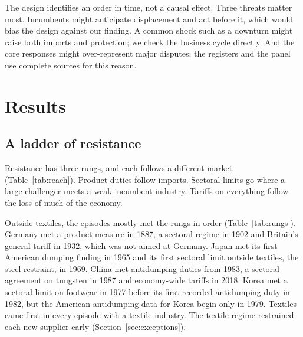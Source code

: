 \documentclass[review,authoryear,12pt]{elsarticle}
\begin{document}
The design identifies an order in time, not a causal effect. Three threats matter most. Incumbents might anticipate displacement and act before it, which would bias the design against our finding. A common shock such as a downturn might raise both imports and protection; we check the business cycle directly. And the core responses might over-represent major disputes; the registers and the panel use complete sources for this reason.

\section{Results}\label{sec:results}

\subsection{A ladder of resistance}\label{sec:reach}

Resistance has three rungs, and each follows a different market (Table~\ref{tab:reach}). Product duties follow imports. Sectoral limits go where a large challenger meets a weak incumbent industry. Tariffs on everything follow the loss of much of the economy.

Outside textiles, the episodes mostly met the rungs in order (Table~\ref{tab:rungs}). Germany met a product measure in 1887, a sectoral regime in 1902 and Britain's general tariff in 1932, which was not aimed at Germany. Japan met its first American dumping finding in 1965 and its first sectoral limit outside textiles, the steel restraint, in 1969. China met antidumping duties from 1983, a sectoral agreement on tungsten in 1987 and economy-wide tariffs in 2018. Korea met a sectoral limit on footwear in 1977 before its first recorded antidumping duty in 1982, but the American antidumping data for Korea begin only in 1979. Textiles came first in every episode with a textile industry. The textile regime restrained each new supplier early (Section~\ref{sec:exceptions}).
\end{document}
